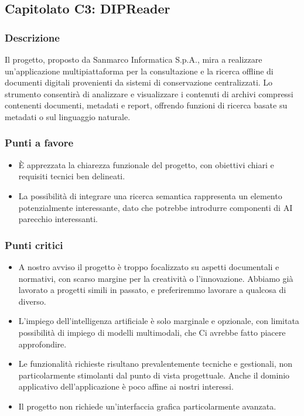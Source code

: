 \documentclass[a4paper,12pt]{article}
\begin{document}
\subsection{Capitolato C3: DIPReader}

\subsubsection{Descrizione}
Il progetto, proposto da Sanmarco Informatica S.p.A., mira a realizzare un’applicazione multipiattaforma per la consultazione e la ricerca offline di documenti digitali provenienti da sistemi di conservazione centralizzati. Lo strumento consentirà di analizzare e visualizzare i contenuti di archivi compressi contenenti documenti, metadati e report, offrendo funzioni di ricerca basate su metadati o sul linguaggio naturale.

\subsubsection{Punti a favore}
\begin{itemize}
    \item È apprezzata la chiarezza funzionale del progetto, con obiettivi chiari e requisiti tecnici ben delineati.
    \item La possibilità di integrare una ricerca semantica rappresenta un elemento potenzialmente interessante, dato che potrebbe introdurre componenti di AI parecchio interessanti.
\end{itemize}

\subsubsection{Punti critici}
\begin{itemize}
    \item A nostro avviso il progetto è troppo focalizzato su aspetti documentali e normativi, con scarso margine per la creatività o l’innovazione. Abbiamo già lavorato a progetti simili in passato, e preferiremmo lavorare a qualcosa di diverso.
    \item L’impiego dell’intelligenza artificiale è solo marginale e opzionale, con limitata possibilità di impiego di modelli multimodali, che Ci avrebbe fatto piacere approfondire.
    \item Le funzionalità richieste risultano prevalentemente tecniche e gestionali, non particolarmente stimolanti dal punto di vista progettuale. Anche il dominio applicativo dell’applicazione è poco affine ai nostri interessi.
    \item Il progetto non richiede un’interfaccia grafica particolarmente avanzata.
\end{itemize}
\end{document}
